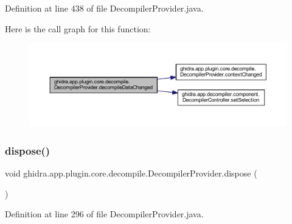 Definition at line 438 of file Decompiler\+Provider.\+java.

Here is the call graph for this function\+:
\nopagebreak
\begin{figure}[H]
\begin{center}
\leavevmode
\includegraphics[width=350pt]{classghidra_1_1app_1_1plugin_1_1core_1_1decompile_1_1_decompiler_provider_a03b1fe5f65766c675710ccd7ac03bc02_cgraph}
\end{center}
\end{figure}
\mbox{\label{classghidra_1_1app_1_1plugin_1_1core_1_1decompile_1_1_decompiler_provider_a6c2bbf952c8ea1a6b9623c7c3e9395c4}} 
\subsubsection{\texorpdfstring{dispose()}{dispose()}}
{\footnotesize\ttfamily void ghidra.\+app.\+plugin.\+core.\+decompile.\+Decompiler\+Provider.\+dispose (\begin{DoxyParamCaption}{ }\end{DoxyParamCaption})\hspace{0.3cm}{\ttfamily [inline]}}



Definition at line 296 of file Decompiler\+Provider.\+java.

